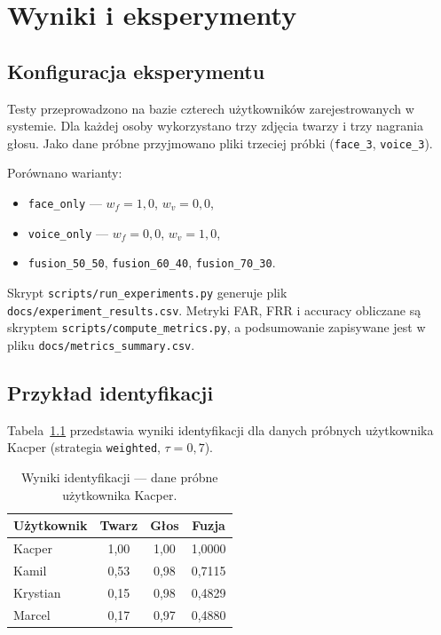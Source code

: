 \chapter{Wyniki i eksperymenty}
\label{cha:wyniki}

\section{Konfiguracja eksperymentu}

Testy przeprowadzono na bazie czterech użytkowników zarejestrowanych w systemie. Dla każdej osoby wykorzystano trzy zdjęcia twarzy i trzy nagrania głosu. Jako dane próbne przyjmowano pliki trzeciej próbki (\texttt{face\_3}, \texttt{voice\_3}).

Porównano warianty:
\begin{itemize}
    \item \texttt{face\_only} --- $w_f = 1{,}0$, $w_v = 0{,}0$,
    \item \texttt{voice\_only} --- $w_f = 0{,}0$, $w_v = 1{,}0$,
    \item \texttt{fusion\_50\_50}, \texttt{fusion\_60\_40}, \texttt{fusion\_70\_30}.
\end{itemize}

Skrypt \texttt{scripts/run\_experiments.py} generuje plik \texttt{docs/experiment\_results.csv}. Metryki FAR, FRR i accuracy obliczane są skryptem \texttt{scripts/compute\_metrics.py}, a podsumowanie zapisywane jest w pliku \texttt{docs/metrics\_summary.csv}.

\section{Przykład identyfikacji}

Tabela~\ref{tab:probe_kacper} przedstawia wyniki identyfikacji dla danych próbnych użytkownika Kacper (strategia \texttt{weighted}, $\tau = 0{,}7$).

\begin{table}[H]
    \centering
    \caption{Wyniki identyfikacji --- dane próbne użytkownika Kacper.\label{tab:probe_kacper}}
    \begin{tabular}{lccc}
        \toprule
        Użytkownik & Twarz & Głos & Fuzja \\
        \midrule
        Kacper   & 1{,}00 & 1{,}00 & 1{,}0000 \\
        Kamil    & 0{,}53 & 0{,}98 & 0{,}7115 \\
        Krystian & 0{,}15 & 0{,}98 & 0{,}4829 \\
        Marcel   & 0{,}17 & 0{,}97 & 0{,}4880 \\
        \bottomrule
    \end{tabular}
\end{table}

